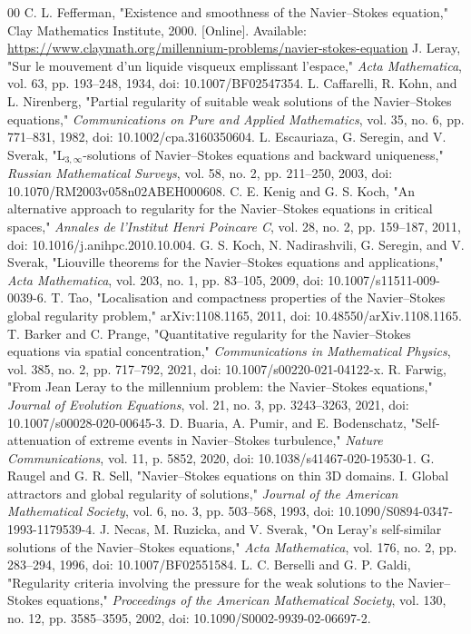 \documentclass[conference]{../../../../Conference-LaTeX-template_10-17-19/IEEEtran}
\begin{document}
\begin{thebibliography}{00}
 C. L. Fefferman, "Existence and smoothness of the Navier--Stokes equation," Clay Mathematics Institute, 2000. [Online]. Available: \url{https://www.claymath.org/millennium-problems/navier-stokes-equation}
 J. Leray, "Sur le mouvement d'un liquide visqueux emplissant l'espace," \emph{Acta Mathematica}, vol. 63, pp. 193--248, 1934, doi: 10.1007/BF02547354.
 L. Caffarelli, R. Kohn, and L. Nirenberg, "Partial regularity of suitable weak solutions of the Navier--Stokes equations," \emph{Communications on Pure and Applied Mathematics}, vol. 35, no. 6, pp. 771--831, 1982, doi: 10.1002/cpa.3160350604.
 L. Escauriaza, G. Seregin, and V. Sverak, "L$_{3,\infty}$-solutions of Navier--Stokes equations and backward uniqueness," \emph{Russian Mathematical Surveys}, vol. 58, no. 2, pp. 211--250, 2003, doi: 10.1070/RM2003v058n02ABEH000608.
 C. E. Kenig and G. S. Koch, "An alternative approach to regularity for the Navier--Stokes equations in critical spaces," \emph{Annales de l'Institut Henri Poincare C}, vol. 28, no. 2, pp. 159--187, 2011, doi: 10.1016/j.anihpc.2010.10.004.
 G. S. Koch, N. Nadirashvili, G. Seregin, and V. Sverak, "Liouville theorems for the Navier--Stokes equations and applications," \emph{Acta Mathematica}, vol. 203, no. 1, pp. 83--105, 2009, doi: 10.1007/s11511-009-0039-6.
 T. Tao, "Localisation and compactness properties of the Navier--Stokes global regularity problem," arXiv:1108.1165, 2011, doi: 10.48550/arXiv.1108.1165.
 T. Barker and C. Prange, "Quantitative regularity for the Navier--Stokes equations via spatial concentration," \emph{Communications in Mathematical Physics}, vol. 385, no. 2, pp. 717--792, 2021, doi: 10.1007/s00220-021-04122-x.
 R. Farwig, "From Jean Leray to the millennium problem: the Navier--Stokes equations," \emph{Journal of Evolution Equations}, vol. 21, no. 3, pp. 3243--3263, 2021, doi: 10.1007/s00028-020-00645-3.
 D. Buaria, A. Pumir, and E. Bodenschatz, "Self-attenuation of extreme events in Navier--Stokes turbulence," \emph{Nature Communications}, vol. 11, p. 5852, 2020, doi: 10.1038/s41467-020-19530-1.
 G. Raugel and G. R. Sell, "Navier--Stokes equations on thin 3D domains. I. Global attractors and global regularity of solutions," \emph{Journal of the American Mathematical Society}, vol. 6, no. 3, pp. 503--568, 1993, doi: 10.1090/S0894-0347-1993-1179539-4.
 J. Necas, M. Ruzicka, and V. Sverak, "On Leray's self-similar solutions of the Navier--Stokes equations," \emph{Acta Mathematica}, vol. 176, no. 2, pp. 283--294, 1996, doi: 10.1007/BF02551584.
 L. C. Berselli and G. P. Galdi, "Regularity criteria involving the pressure for the weak solutions to the Navier--Stokes equations," \emph{Proceedings of the American Mathematical Society}, vol. 130, no. 12, pp. 3585--3595, 2002, doi: 10.1090/S0002-9939-02-06697-2.
\end{thebibliography}
\end{document}
